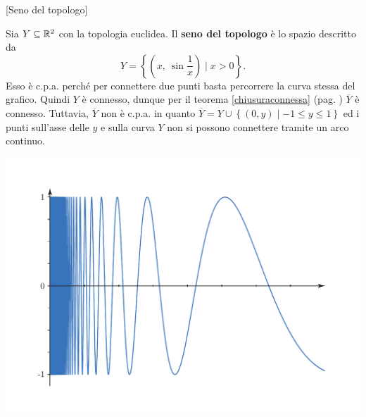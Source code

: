 \begin{example}{}[Seno del topologo]
\begin{minipage}{0.47\textwidth}
Sia $Y\subseteq \mathbb{R}^2$ con la topologia euclidea. Il  \textbf{seno del topologo} è lo spazio descritto da
\begin{equation*}
	Y=\left\{ \left( x,\ \sin\frac{1}{x} \right) \mid x>0 \right\}. 
\end{equation*}
Esso è c.p.a. perché per connettere due punti basta percorrere la curva stessa del grafico. Quindi $Y$ è connesso, dunque per il teorema \ref{chiusuraconnessa} (pag. \pageref{chiusuraconnessa}) $\overline{Y}$ è connesso. Tuttavia, $\overline{Y}$ non è c.p.a. in quanto $\overline{Y}=Y\cup \left\{ (0,y) \mid -1\leq y \leq 1 \right\}$ ed i punti sull'asse delle $y$ e sulla curva $Y$ non si possono connettere tramite un arco continuo.
\end{minipage}
\hspace{-7mm}
\begin{minipage}{0.52\textwidth}
	\includegraphics[trim=0cm 0.5cm 0.5cm 1.25cm,clip,scale=0.50]{images/topologistsine.pdf}
\end{minipage}
\end{example}
\vspace{6mm}
